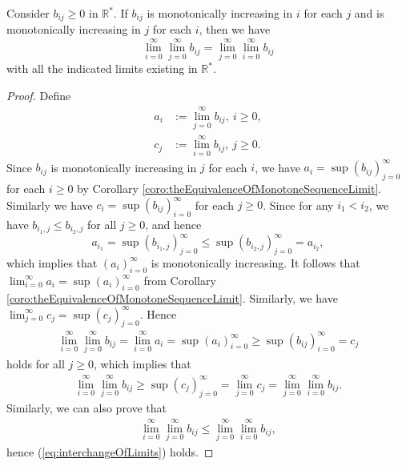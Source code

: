 \begin{thm}
  \label{thm:interchangeOfLimits}
  Consider $b_{ij}\ge 0$ in $\mathbb{R}^*$.
  If $b_{ij}$ is monotonically increasing in $i$ for each $j$
  and is monotonically increasing in $j$ for each $i$,
  then we have
  \begin{equation}
    \label{eq:interchangeOfLimits}
    \lim_{i=0}^{\infty} \lim_{j=0}^{\infty} b_{ij}
    = \lim_{j=0}^{\infty} \lim_{i=0}^{\infty} b_{ij}
  \end{equation}
  with all the indicated limits existing in $\mathbb{R}^*$.
\end{thm}
\begin{proof}
  Define
  \begin{align*}
    a_{i}&:=\lim_{j=0}^{\infty}b_{ij},\ i\ge 0,\\
    c_{j}&:=\lim_{i=0}^{\infty}b_{ij},\ j\ge 0.
  \end{align*}
  Since $b_{ij}$ is monotonically increasing in $j$ for each $i$,
  we have $a_{i}=\sup(b_{ij})_{j=0}^{\infty}$ for each $i\ge 0$
  by Corollary \ref{coro:theEquivalenceOfMonotoneSequenceLimit}.
  Similarly we have $c_{i}=\sup(b_{ij})_{i=0}^{\infty}$ for each $j\ge 0$.
  Since for any $i_{1}<i_{2}$, we have
  $b_{i_{1},j}\le b_{i_{2},j}$ for all $j\ge 0$, and hence
  \begin{displaymath}
    a_{i_{1}}=\sup(b_{i_{1},j})_{j=0}^{\infty}
    \le \sup(b_{i_{2},j})_{j=0}^{\infty} =a_{i_{2}},
  \end{displaymath}
  which implies that
  $(a_{i})_{i=0}^{\infty}$ is monotonically increasing. It follows that
  $\lim_{i=0}^{\infty}a_{i}=\sup(a_{i})_{i=0}^{\infty}$
  from Corollary \ref{coro:theEquivalenceOfMonotoneSequenceLimit}.
  Similarly, we have
  $\lim_{j=0}^{\infty}c_{j}=\sup(c_{j})_{j=0}^{\infty}.$
  Hence
  \begin{align*}
    \lim_{i=0}^{\infty} \lim_{j=0}^{\infty} b_{ij}
    =\lim_{i=0}^{\infty} a_{i}
    =\sup(a_{i})_{i=0}^{\infty}
    \ge \sup(b_{ij})_{i=0}^{\infty}
    =c_{j}
  \end{align*}
  holds for all $j\ge 0$, which implies that
  \begin{align*}
    \lim_{i=0}^{\infty} \lim_{j=0}^{\infty} b_{ij}
    \ge \sup(c_{j})_{j=0}^{\infty}
    =\lim_{j=0}^{\infty} c_{j}
    =\lim_{j=0}^{\infty} \lim_{i=0}^{\infty} b_{ij}.
  \end{align*}
  Similarly, we can also prove that
  \begin{align*}
    \lim_{i=0}^{\infty} \lim_{j=0}^{\infty} b_{ij}
    \le \lim_{j=0}^{\infty} \lim_{i=0}^{\infty} b_{ij},
  \end{align*}
  hence (\ref{eq:interchangeOfLimits}) holds.
\end{proof}

